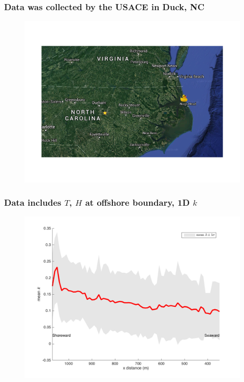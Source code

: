 \documentclass[7pt]{beamer}
\begin{document}
\begin{frame}
	\frametitle{Data was collected by the  USACE in Duck, NC}
		 \centering
		 \begin{figure}
       			 \includegraphics[width=1\linewidth]{img/map_ncsu_duck.png}
       		 \end{figure}
\end{frame}

\begin{frame}
	\frametitle{Data includes $T$, $H$ at offshore boundary, 1D $k$}
		\begin{figure}[H]
			\centering
			\includegraphics[width=1\linewidth]{img/k1Dmean_std.png}
		\end{figure}
\end{frame}
\end{document}
